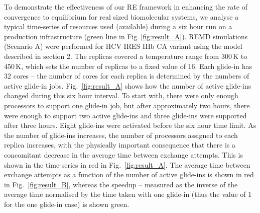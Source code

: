\documentclass{rspublic}
\begin{document}
To demonstrate the effectiveness of our RE framework in enhancing
the rate of convergence to equilibrium for real sized
biomolecular systems, we analyse a typical time-series of resources
used (available) during a six hour run on a production infrastructure
(green line in Fig~\ref{fig:result_A}).  REMD simulations (Scenario A)
were performed for HCV IRES IIIb CA variant using the model described
in section 2. The replicas covered a temperature range from 300\,K to
450\,K, which sets the number of replicas to a fixed value of 16.  Each
glide-in has 32 cores -- the number of cores for each replica is
determined by the numbers of active glide-in jobs.
Fig.~\ref{fig:result_A} shows how the number of active glide-ins
changed during this six hour interval. To start with, there were only
enough processors to support one glide-in job, but after approximately
two hours, there were enough to support two active glide-ins and three
glide-ins were supported after three hours. Eight glide-ins were
activated before the six hour time limit. As the number of glide-ins
increases, the number of processors assigned to each replica
increases, with the physically important consequence that there is a
concomitant decrease in the average time between exchange
attempts. This is shown in the time-series in red in
Fig.~\ref{fig:result_A}.  The average time between exchange attempts
as a function of the number of active glide-ins is shown in red in
Fig.~\ref{fig:result_B}, whereas the speedup -- measured as the inverse
of the average time normalised by the time taken with one glide-in (thus
the value of 1 for the one glide-in case) is shown green.
\end{document}
